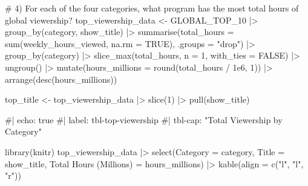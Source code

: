 \documentclass[
  12pt,
  letterpaper,
  DIV=11,
  numbers=noendperiod]{scrartcl}
\newenvironment{Shaded}{\begin{snugshade}}{\end{snugshade}}
\newcommand{\AttributeTok}[1]{\textcolor[rgb]{0.40,0.45,0.13}{#1}}
\newcommand{\CommentTok}[1]{\textcolor[rgb]{0.37,0.37,0.37}{#1}}
\newcommand{\ConstantTok}[1]{\textcolor[rgb]{0.56,0.35,0.01}{#1}}
\newcommand{\DecValTok}[1]{\textcolor[rgb]{0.68,0.00,0.00}{#1}}
\newcommand{\FloatTok}[1]{\textcolor[rgb]{0.68,0.00,0.00}{#1}}
\newcommand{\FunctionTok}[1]{\textcolor[rgb]{0.28,0.35,0.67}{#1}}
\newcommand{\NormalTok}[1]{\textcolor[rgb]{0.00,0.23,0.31}{#1}}
\newcommand{\OtherTok}[1]{\textcolor[rgb]{0.00,0.23,0.31}{#1}}
\newcommand{\SpecialCharTok}[1]{\textcolor[rgb]{0.37,0.37,0.37}{#1}}
\newcommand{\StringTok}[1]{\textcolor[rgb]{0.13,0.47,0.30}{#1}}
\begin{document}
\begin{Shaded}
\begin{Highlighting}[]
\CommentTok{\# 4) For each of the four categories, what program has the most total hours of global viewership?}
\NormalTok{top\_viewership\_data }\OtherTok{\textless{}{-}}\NormalTok{ GLOBAL\_TOP\_10 }\SpecialCharTok{|\textgreater{}} 
  \FunctionTok{group\_by}\NormalTok{(category, show\_title) }\SpecialCharTok{|\textgreater{}}
  \FunctionTok{summarise}\NormalTok{(}\AttributeTok{total\_hours =} \FunctionTok{sum}\NormalTok{(weekly\_hours\_viewed, }\AttributeTok{na.rm =} \ConstantTok{TRUE}\NormalTok{), }\AttributeTok{.groups =} \StringTok{"drop"}\NormalTok{) }\SpecialCharTok{|\textgreater{}}
  \FunctionTok{group\_by}\NormalTok{(category) }\SpecialCharTok{|\textgreater{}}
  \FunctionTok{slice\_max}\NormalTok{(total\_hours, }\AttributeTok{n =} \DecValTok{1}\NormalTok{, }\AttributeTok{with\_ties =} \ConstantTok{FALSE}\NormalTok{) }\SpecialCharTok{|\textgreater{}} 
  \FunctionTok{ungroup}\NormalTok{() }\SpecialCharTok{|\textgreater{}}
  \FunctionTok{mutate}\NormalTok{(}\AttributeTok{hours\_millions =} \FunctionTok{round}\NormalTok{(total\_hours }\SpecialCharTok{/} \FloatTok{1e6}\NormalTok{, }\DecValTok{1}\NormalTok{)) }\SpecialCharTok{|\textgreater{}}
  \FunctionTok{arrange}\NormalTok{(}\FunctionTok{desc}\NormalTok{(hours\_millions))}

\NormalTok{top\_title }\OtherTok{\textless{}{-}}\NormalTok{ top\_viewership\_data }\SpecialCharTok{|\textgreater{}} \FunctionTok{slice}\NormalTok{(}\DecValTok{1}\NormalTok{) }\SpecialCharTok{|\textgreater{}} \FunctionTok{pull}\NormalTok{(show\_title)}

\CommentTok{\#| echo: true}
\CommentTok{\#| label: tbl{-}top{-}viewership}
\CommentTok{\#| tbl{-}cap: "Total Viewership by Category"}

\FunctionTok{library}\NormalTok{(knitr)}
\NormalTok{top\_viewership\_data }\SpecialCharTok{|\textgreater{}}
  \FunctionTok{select}\NormalTok{(}\AttributeTok{Category =}\NormalTok{ category, }\AttributeTok{Title =}\NormalTok{ show\_title, }\StringTok{\textasciigrave{}}\AttributeTok{Total Hours (Millions)}\StringTok{\textasciigrave{}} \OtherTok{=}\NormalTok{ hours\_millions) }\SpecialCharTok{|\textgreater{}}
  \FunctionTok{kable}\NormalTok{(}\AttributeTok{align =} \FunctionTok{c}\NormalTok{(}\StringTok{"l"}\NormalTok{, }\StringTok{"l"}\NormalTok{, }\StringTok{"r"}\NormalTok{))}
\end{Highlighting}
\end{Shaded}
\end{document}
